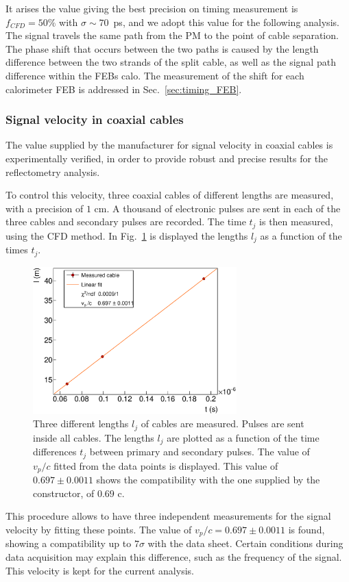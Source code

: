 It arises the value giving the best precision on timing measurement is $f_{CFD} = 50\%$ with $\sigma\sim70$~ps, and we adopt this value for the following analysis.
The signal travels the same path from the PM to the point of cable separation.
The phase shift that occurs between the two paths is caused by the length difference between the two strands of the split cable, as well as the signal path difference within the FEBs calo.
The measurement of the shift for each calorimeter FEB is addressed in Sec.~\ref{sec:timing_FEB}.

\subsubsection*{Signal velocity in coaxial cables}

The value supplied by the manufacturer for signal velocity in coaxial cables is experimentally verified, in order to provide robust and precise results for the reflectometry analysis.

To control this velocity, three coaxial cables of different lengths are measured, with a precision of $1$ cm.
A thousand of electronic pulses are sent in each of the three cables and secondary pulses are recorded.
The time $t_{j}$ is then measured, using the CFD method.
In Fig.~\ref{fig:celerity} is displayed the lengths $l_{j}$ as a function of the times $t_{j}$.
\begin{figure}[h!]
  \centering
  \includegraphics[width=0.7\textwidth]{commissioning/fig_commissioning/celerity.eps}
  \caption{Three different lengths $l_{j}$ of cables are measured.
    Pulses are sent inside all cables.
    The lengths $l_{j}$ are plotted as a function of the time differences $t_{j}$ between primary and secondary pulses.
    The value of $v_{p}/c$ fitted from the data points is displayed.
    This value of $0.697\pm 0.0011$ shows the compatibility with the one supplied by the constructor, of $0.69$ c.
    \label{fig:celerity}}
\end{figure}
This procedure allows to have three independent measurements for the signal velocity by fitting these points.
The value of $v_{p}/c = 0.697\pm 0.0011$ is found, showing a compatibility up to $7\sigma$ with the data sheet.
Certain conditions during data acquisition may explain this difference, such as the frequency of the signal.
This velocity is kept for the current analysis.

